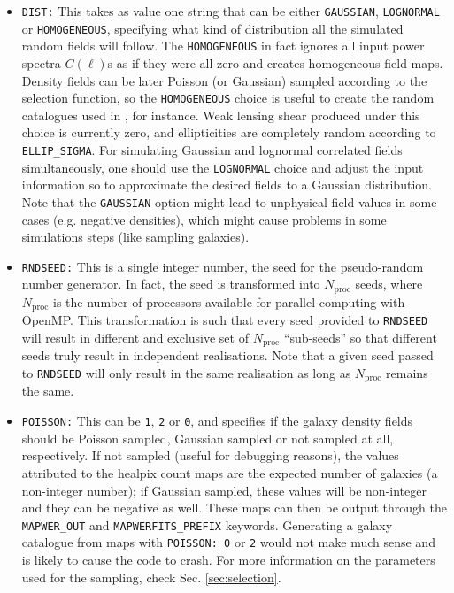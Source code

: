 \documentclass[12pt]{book} %
\newcommand{\nv}[1]{\mathrm{#1}}                 %
\begin{document}
\begin{itemize}

\item {\tt DIST:} This takes as value one string that can be either {\tt GAUSSIAN}, 
  {\tt LOGNORMAL} or {\tt HOMOGENEOUS}, specifying what kind of distribution all 
  the simulated random fields will follow. The {\tt HOMOGENEOUS} in fact ignores 
  all input power spectra $C(\ell)$s as if they were all zero and creates homogeneous 
  field maps. Density fields can be later Poisson (or Gaussian) sampled according to the selection 
  function, so the {\tt HOMOGENEOUS} choice is useful to create the random catalogues 
  used in \citet{LandySzalay93x}, for instance. Weak lensing shear produced under this 
  choice is currently zero, and ellipticities are completely random according to 
  {\tt ELLIP\_SIGMA}. For simulating Gaussian and lognormal correlated fields 
  simultaneously, one should use the {\tt LOGNORMAL} choice and adjust the input 
  information so to approximate the desired fields to a Gaussian distribution. Note that 
  the {\tt GAUSSIAN} option might lead to unphysical field values in some cases (e.g. 
  negative densities), which might cause problems in some simulations steps (like sampling 
  galaxies).

\item {\tt RNDSEED:} This is a single integer number, the seed for the pseudo-random 
  number generator. In fact, the seed is transformed into $N_{\nv{proc}}$ seeds, where 
  $N_{\nv{proc}}$ is the number of processors available for parallel computing with 
  {\sc OpenMP}. This transformation is such that every seed provided to {\tt RNDSEED} 
  will result in different and exclusive set of $N_{\nv{proc}}$ ``sub-seeds'' so that different seeds truly 
  result in independent realisations. Note that a given seed passed to {\tt RNDSEED} will 
  only result in the same realisation as long as $N_{\nv{proc}}$ remains the same.

\item {\tt POISSON:} This can be {\tt 1}, {\tt 2} or {\tt 0}, and specifies if the galaxy density 
  fields should be Poisson sampled, Gaussian sampled or not sampled at all, respectively. 
  If not sampled (useful for debugging reasons), the values attributed to the {\sc healpix} count maps 
  are the expected number of galaxies (a non-integer number); if Gaussian sampled, these values 
  will be non-integer and they can be negative as well. These maps can then be output 
  through the {\tt MAPWER\_OUT} and {\tt MAPWERFITS\_PREFIX} keywords. Generating a galaxy catalogue 
  from maps with {\tt POISSON: 0} or {\tt 2} would not make much sense and is likely to cause the 
  code to crash. For more information on the parameters used for the sampling, check Sec. 
  \ref{sec:selection}.


\end{itemize}
\end{document}
